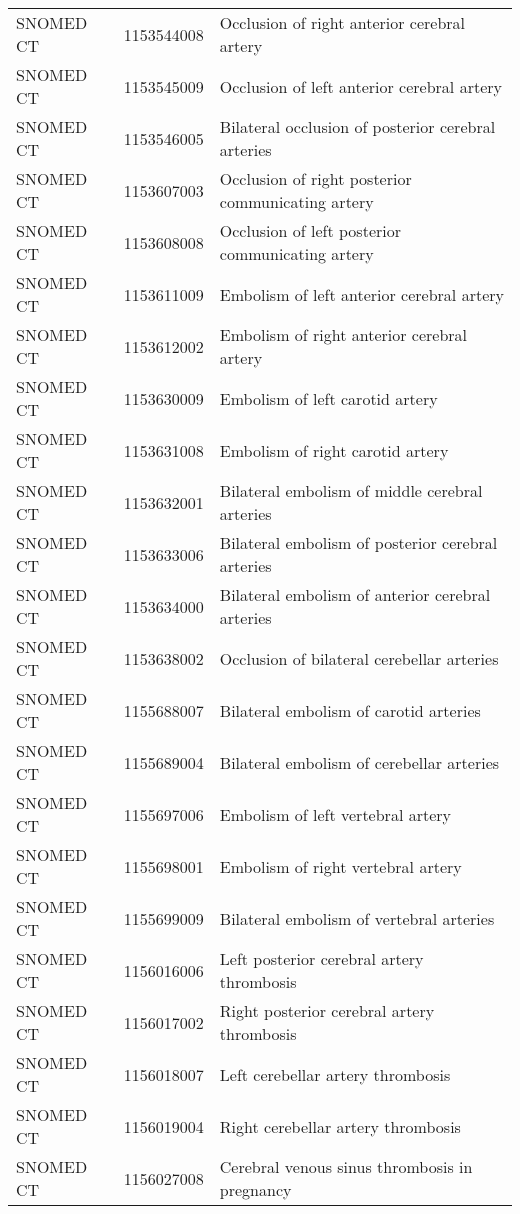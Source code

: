 \begin{longtable}{p{}p{}p{}}
  SNOMED CT & 1153544008 & Occlusion of right anterior cerebral artery \\ 
  SNOMED CT & 1153545009 & Occlusion of left anterior cerebral artery \\ 
  SNOMED CT & 1153546005 & Bilateral occlusion of posterior cerebral arteries \\ 
  SNOMED CT & 1153607003 & Occlusion of right posterior communicating artery \\ 
  SNOMED CT & 1153608008 & Occlusion of left posterior communicating artery \\ 
  SNOMED CT & 1153611009 & Embolism of left anterior cerebral artery \\ 
  SNOMED CT & 1153612002 & Embolism of right anterior cerebral artery \\ 
  SNOMED CT & 1153630009 & Embolism of left carotid artery \\ 
  SNOMED CT & 1153631008 & Embolism of right carotid artery \\ 
  SNOMED CT & 1153632001 & Bilateral embolism of middle cerebral arteries \\ 
  SNOMED CT & 1153633006 & Bilateral embolism of posterior cerebral arteries \\ 
  SNOMED CT & 1153634000 & Bilateral embolism of anterior cerebral arteries \\ 
  SNOMED CT & 1153638002 & Occlusion of bilateral cerebellar arteries \\ 
  SNOMED CT & 1155688007 & Bilateral embolism of carotid arteries \\ 
  SNOMED CT & 1155689004 & Bilateral embolism of cerebellar arteries \\ 
  SNOMED CT & 1155697006 & Embolism of left vertebral artery \\ 
  SNOMED CT & 1155698001 & Embolism of right vertebral artery \\ 
  SNOMED CT & 1155699009 & Bilateral embolism of vertebral arteries \\ 
  SNOMED CT & 1156016006 & Left posterior cerebral artery thrombosis \\ 
  SNOMED CT & 1156017002 & Right posterior cerebral artery thrombosis \\ 
  SNOMED CT & 1156018007 & Left cerebellar artery thrombosis \\ 
  SNOMED CT & 1156019004 & Right cerebellar artery thrombosis \\ 
  SNOMED CT & 1156027008 & Cerebral venous sinus thrombosis in pregnancy \\ 

\end{longtable}
